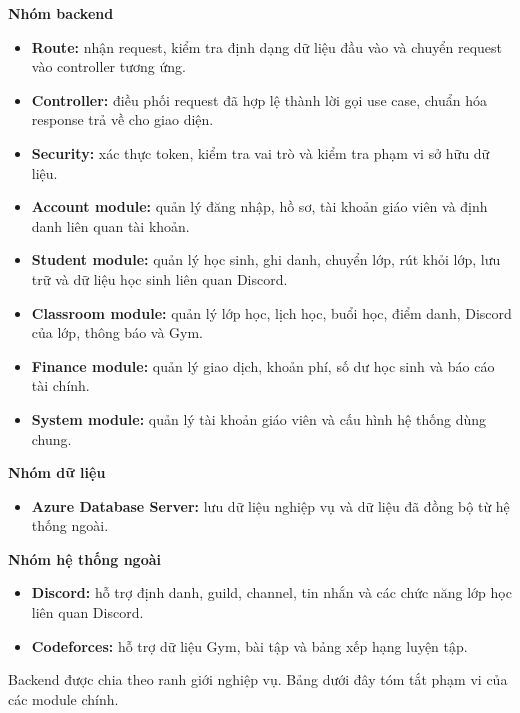 \documentclass[12pt,a4paper]{article}
\begin{document}
\textbf{Nhóm backend}
\begin{itemize}[leftmargin=*]
    \item \textbf{Route:} nhận request, kiểm tra định dạng dữ liệu đầu vào và chuyển request vào controller tương ứng.
    \item \textbf{Controller:} điều phối request đã hợp lệ thành lời gọi use case, chuẩn hóa response trả về cho giao diện.
    \item \textbf{Security:} xác thực token, kiểm tra vai trò và kiểm tra phạm vi sở hữu dữ liệu.
    \item \textbf{Account module:} quản lý đăng nhập, hồ sơ, tài khoản giáo viên và định danh liên quan tài khoản.
    \item \textbf{Student module:} quản lý học sinh, ghi danh, chuyển lớp, rút khỏi lớp, lưu trữ và dữ liệu học sinh liên quan Discord.
    \item \textbf{Classroom module:} quản lý lớp học, lịch học, buổi học, điểm danh, Discord của lớp, thông báo và Gym.
    \item \textbf{Finance module:} quản lý giao dịch, khoản phí, số dư học sinh và báo cáo tài chính.
    \item \textbf{System module:} quản lý tài khoản giáo viên và cấu hình hệ thống dùng chung.
\end{itemize}

\textbf{Nhóm dữ liệu}
\begin{itemize}[leftmargin=*]
    \item \textbf{Azure Database Server:} lưu dữ liệu nghiệp vụ và dữ liệu đã đồng bộ từ hệ thống ngoài.
\end{itemize}

\textbf{Nhóm hệ thống ngoài}
\begin{itemize}[leftmargin=*]
    \item \textbf{Discord:} hỗ trợ định danh, guild, channel, tin nhắn và các chức năng lớp học liên quan Discord.
    \item \textbf{Codeforces:} hỗ trợ dữ liệu Gym, bài tập và bảng xếp hạng luyện tập.
\end{itemize}

Backend được chia theo ranh giới nghiệp vụ. Bảng dưới đây tóm tắt phạm vi của
các module chính.
\end{document}
